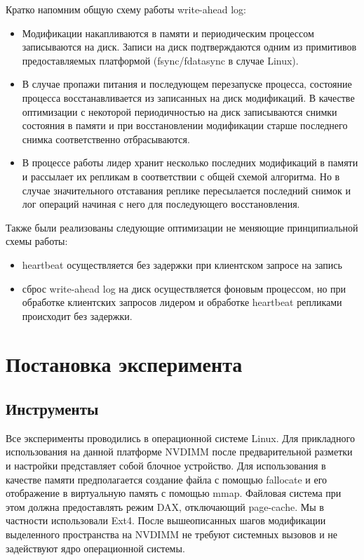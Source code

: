 \documentclass[pdftex,ptm,12pt,a4paper]{report}
\theoremstyle{definition}
\begin{document}
Кратко напомним общую схему работы write-ahead log:
\begin{itemize}
    \item Модификации накапливаются в памяти и периодическим процессом записываются на диск. Записи на диск подтверждаются одним из примитивов предоставляемых платформой (fsync/fdatasync в случае Linux).
    \item В случае пропажи питания и последующем перезапуске процесса, состояние процесса восстанавливается из записанных на диск модификаций. В качестве оптимизации
        с некоторой периодичностью на диск записываются снимки состояния в памяти и при восстановлении модификации старше последнего снимка соответственно отбрасываются.
    \item В процессе работы лидер хранит несколько последних модификаций в памяти и рассылает их репликам в соответствии с общей схемой алгоритма.
        Но в случае значительного отставания реплике пересылается последний снимок и лог операций начиная с него для последующего восстановления.
\end{itemize}

Также были реализованы следующие оптимизации не меняющие принципиальной схемы работы:
\begin{itemize}
\item heartbeat осуществляется без задержки при клиентском запросе на запись
\item сброс write-ahead log на диск осуществляется фоновым процессом, но при обработке клиентских запросов лидером и обработке heartbeat репликами происходит без задержки.
\end{itemize}

\chapter{Постановка эксперимента}
\section{Инструменты}

Все эксперименты проводились в операционной системе Linux.  Для прикладного использования на данной платформе NVDIMM
после предварительной разметки и настройки представляет собой блочное устройство. Для использования в качестве памяти предполагается создание файла с помощью fallocate
и его отображение в виртуальную память с помощью mmap. Файловая система при этом должна предоставлять режим DAX, отключающий page-cache. Мы в частности использовали Ext4.
После вышеописанных шагов модификации выделенного пространства на NVDIMM не требуют системных вызовов и не задействуют ядро операционной системы.
\end{document}
